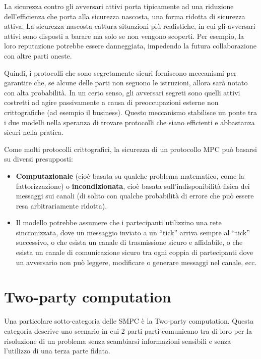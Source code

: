 \documentclass[
  italian,
]{book}
\providecommand{\tightlist}{%
  \setlength{\itemsep}{0pt}\setlength{\parskip}{0pt}}
\begin{document}
\newpage

La sicurezza contro gli avversari attivi porta tipicamente ad una riduzione dell'efficienza che porta alla sicurezza nascosta, una forma ridotta di sicurezza attiva. La sicurezza nascosta cattura situazioni più realistiche, in cui gli avversari attivi sono disposti a barare ma solo se non vengono scoperti. Per esempio, la loro reputazione potrebbe essere danneggiata, impedendo la futura collaborazione con altre parti oneste.

Quindi, i protocolli che sono segretamente sicuri forniscono meccanismi per garantire che, se alcune delle parti non seguono le istruzioni, allora sarà notato con alta probabilità. In un certo senso, gli avversari segreti sono quelli attivi costretti ad agire passivamente a causa di preoccupazioni esterne non crittografiche (ad esempio il business). Questo meccanismo stabilisce un ponte tra i due modelli nella speranza di trovare protocolli che siano efficienti e abbastanza sicuri nella pratica.

Come molti protocolli crittografici, la sicurezza di un protocollo MPC può basarsi su diversi presupposti:

\begin{itemize}
\tightlist
\item
  \textbf{Computazionale} (cioè basata su qualche problema matematico, come la fattorizzazione) o \textbf{incondizionata}, cioè basata sull'indisponibilità fisica dei messaggi sui canali (di solito con qualche probabilità di errore che può essere resa arbitrariamente ridotta).
\item
  Il modello potrebbe assumere che i partecipanti utilizzino una rete sincronizzata, dove un messaggio inviato a un ``tick'' arriva sempre al ``tick'' successivo, o che esista un canale di trasmissione sicuro e affidabile, o che esista un canale di comunicazione sicuro tra ogni coppia di partecipanti dove un avversario non può leggere, modificare o generare messaggi nel canale, ecc.
\end{itemize}

\newpage

\hypertarget{two-party-computation}{%
\section{Two-party computation}\label{two-party-computation}}

Una particolare sotto-categoria delle SMPC è la Two-party computation. Questa categoria descrive uno scenario in cui 2 parti parti comunicano tra di loro per la risoluzione di un problema senza scambiarsi informazioni sensibili e senza l'utilizzo di una terza parte fidata.
\end{document}
